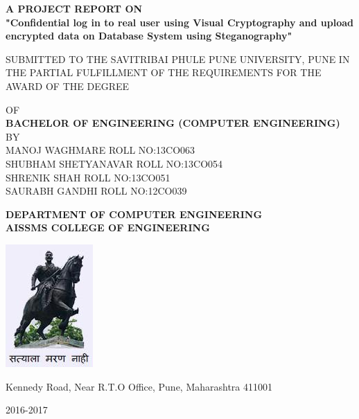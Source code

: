 \begin{titlepage}
\centering


%

\textbf{A PROJECT REPORT ON}\\\vspace{1cm}\large\textbf{"Confidential log in to real user using Visual Cryptography and upload encrypted data on Database System using Steganography"}\\\vspace{1cm}

SUBMITTED TO THE SAVITRIBAI PHULE PUNE UNIVERSITY, PUNE
IN THE PARTIAL FULFILLMENT OF THE REQUIREMENTS 
FOR THE AWARD OF THE DEGREE 
\begin{center}

\vspace{1cm} OF\\\vspace{1cm}\textbf{BACHELOR OF ENGINEERING (COMPUTER ENGINEERING) }\\\vspace{1cm}BY\vspace{1cm}\\
{\small{MANOJ WAGHMARE} \hspace{22mm} {\small ROLL NO:13CO063}\\{SHUBHAM SHETYANAVAR} \hspace{13mm} {\small ROLL NO:13CO054 } \\{SHRENIK SHAH} \hspace{32mm} {\small ROLL NO:13CO051} \\{SAURABH GANDHI } \hspace{26.8mm} {\small ROLL NO:12CO039 }\\\vspace{1cm}}
\end{center}
\textbf{DEPARTMENT OF COMPUTER ENGINEERING}\\ 
\textbf{AISSMS COLLEGE OF ENGINEERING} \\
\begin{center}
\includegraphics[scale=0.6]{logo.png}
\end{center}
Kennedy Road, Near R.T.O Office, Pune, Maharashtra 411001

2016-2017
\end{titlepage}
